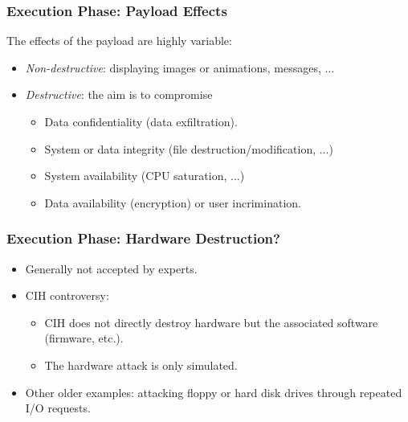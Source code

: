 \documentclass{beamer}
\newcommand{\enlight}[1]{\textit{\color{blue}#1}}
\begin{document}
\begin{frame}
\frametitle{Execution Phase: Payload Effects}
The effects of the payload are highly variable:
\begin{itemize}
\item \enlight{Non-destructive}: displaying images or animations, messages, ... %
\item \enlight{Destructive}: the aim is to compromise
\begin{itemize}
\item  Data confidentiality (data exfiltration).
  \smallskip

\item  System or data integrity (file destruction/modification, ...) %
  \smallskip

  \item System availability (CPU saturation, ...)
    \smallskip

  \item Data availability (encryption) or user incrimination.%
\end{itemize}
\end{itemize}
\end{frame}



\begin{frame}
\frametitle{Execution Phase: Hardware Destruction?}
\begin{itemize}
\item Generally not accepted by experts.
\item CIH controversy:
  \begin{itemize}
  \item CIH does not directly destroy hardware but the associated software (firmware, etc.).
  \item The hardware attack is only simulated.
  \end{itemize}
\item Other older examples: attacking floppy or hard disk drives through repeated I/O requests.
\end{itemize}
\end{frame}
\end{document}
